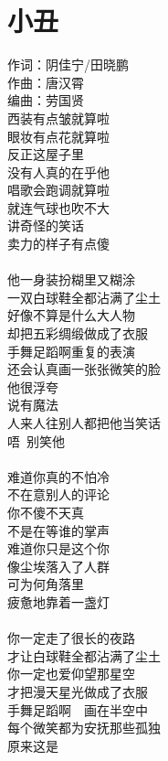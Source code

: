 \documentclass[twocolumn]{article}
\begin{document}
\newpage
\section{小丑}
\noindent
{\kaishu
	作词：阴佳宁/田晓鹏\\
	作曲：唐汉霄\\
	编曲：劳国贤\\
}
西装有点皱就算啦\\
眼妆有点花就算啦\\
反正这屋子里\\
没有人真的在乎他\\
唱歌会跑调就算啦\\
就连气球也吹不大\\
讲奇怪的笑话\\
卖力的样子有点傻\\\\
他一身装扮糊里又糊涂\\
一双白球鞋全都沾满了尘土\\
好像不算是什么大人物\\
却把五彩绸缎做成了衣服\\
手舞足蹈啊重复的表演\\
还会认真画一张张微笑的脸\\
他很浮夸\\
说有魔法\\
人来人往别人都把他当笑话\\
唔~别笑他\\
\\
难道你真的不怕冷\\
不在意别人的评论\\
你不傻不天真\\
不是在等谁的掌声\\
难道你只是这个你\\
像尘埃落入了人群\\
可为何角落里\\
疲惫地靠着一盏灯\\\\
你一定走了很长的夜路\\
才让白球鞋全都沾满了尘土\\
你一定也爱仰望那星空\\
才把漫天星光做成了衣服\\
手舞足蹈啊~~画在半空中\\
每个微笑都为安抚那些孤独\\
原来这是\\
\\\\
\end{document}
